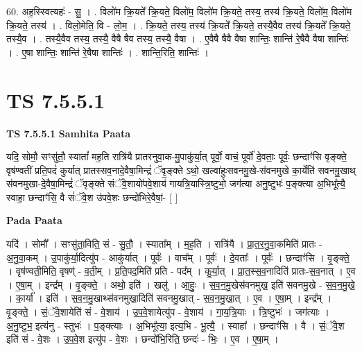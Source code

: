 \documentclass[17pt]{extarticle}
\begin{document}
60. अह॒स्स्वित्यहः॑ - सु॒ । . विलो॑म क्रि॒यते᳚ क्रि॒यते॒ विलो॑म॒ विलो॑म क्रि॒यते॒ तस्य॒ तस्य॑ क्रि॒यते॒ विलो॑म॒ विलो॑म क्रि॒यते॒ तस्य॑ । . विलो॒मेति॒ वि - लो॒म॒ । . क्रि॒यते॒ तस्य॒ तस्य॑ क्रि॒यते᳚ क्रि॒यते॒ तस्यै॒वैव तस्य॑ क्रि॒यते᳚ क्रि॒यते॒ तस्यै॒व । . तस्यै॒वैव तस्य॒ तस्यै॒ वैषै षैव तस्य॒ तस्यै॒ वैषा । . ए॒वैषै षैवै वैषा शान्तिः॒ शान्ति॑ रे॒षैवै वैषा शान्तिः॑ । . ए॒षा शान्तिः॒ शान्ति॑ रे॒षैषा शान्तिः॑ । . शान्ति॒रिति॒ शान्तिः॑ । \newline
\pagebreak
{}

\section{ TS 7.5.5.1 }

\textbf{TS 7.5.5.1 } \newline
\textbf{Samhita Paata} \newline

यदि॒ सोमौ॒ सꣳसु॑तौ॒ स्यातां᳚ मह॒ति रात्रि॑यै प्रातरनुवा॒क-मु॒पाकु॑र्या॒त् पूर्वो॒ वाचं॒ पूर्वो॑ दे॒वताः॒ पूर्वः॒ छन्दाꣳ॑सि वृङ्क्ते॒ वृष॑ण्वतीं प्रति॒पदं॑ कुर्यात् प्रातस्सव॒नादे॒वैषा॒मिन्द्रं॑ ॅवृ॒ङ्क्ते ऽथो॒ खल्वा॑हुःसवनमु॒खे-स॑वनमुखे का॒र्येति॑ सवनमु॒खाथ् स॑वनमुखा-दे॒वैषा॒मिन्द्रं॑ ॅवृङ्क्ते संॅवे॒शायो॑पवे॒शाय॑ गायत्रि॒यास्त्रि॒ष्टुभो॒ जग॑त्या अनु॒ष्टुभः॑ प॒ङ्क्त्या अ॒भिभू᳚त्यै॒ स्वाहा॒ छन्दाꣳ॑सि॒ वै सं॑ॅवे॒श उ॑पवे॒शः छन्दो॑भिरे॒वैषां॒- [  ] \newline

\textbf{Pada Paata} \newline

यदि॑ । सोमौ᳚ । सꣳसु॑ता॒विति॒ सं - सु॒तौ॒ । स्याता᳚म् । म॒ह॒ति । रात्रि॑यै । प्रा॒त॒र॒नु॒वा॒कमिति॑ प्रातः - अ॒नु॒वा॒कम् । उ॒पाकु॑र्या॒दित्यु॑प - आकु॑र्यात् । पूर्वः॑ । वाच᳚म् । पूर्वः॑ । दे॒वताः᳚ । पूर्वः॑ । छन्दाꣳ॑सि । वृ॒ङ्क्ते॒ । वृष॑ण्वती॒मिति॒ वृषण्॑ - व॒ती॒म् । प्र॒ति॒पद॒मिति॑ प्रति - पद᳚म् । कु॒र्या॒त् । प्रा॒त॒स्स॒व॒नादिति॑ प्रातः-स॒व॒नात् । ए॒व । ए॒षा॒म् । इन्द्र᳚म् । वृ॒ङ्क्ते॒ । अथो॒ इति॑ । खलु॑ । आ॒हुः॒ । स॒व॒न॒मु॒खेस॑वनमुख॒ इति॑ सवनमु॒खे - स॒व॒न॒मु॒खे॒ । का॒र्या᳚ । इति॑ । स॒व॒न॒मु॒खाथ्स॑वनमुखा॒दिति॑ सवनमु॒खात् - स॒व॒न॒मु॒खा॒त् । ए॒व । ए॒षा॒म् । इन्द्र᳚म् । वृ॒ङ्क्ते॒ । सं॒ॅवे॒शायेति॑ सं - वे॒शाय॑ । उ॒प॒वे॒शायेत्यु॑प - वे॒शाय॑ । गा॒य॒त्रि॒याः । त्रि॒ष्टुभः॑ । जग॑त्याः । अ॒नु॒ष्टुभ॒ इत्य॑नु - स्तुभः॑ । प॒ङ्क्त्याः । अ॒भिभू᳚त्या॒ इत्य॒भि - भू॒त्यै॒ । स्वाहा᳚ । छन्दाꣳ॑सि । वै । सं॒ॅवे॒श इति॑ सं - वे॒शः । उ॒प॒वे॒श इत्यु॑प - वे॒शः । छन्दो॑भि॒रिति॒ छन्दः॑ - भिः॒ । ए॒व । ए॒षा॒म् ।  \newline
\end{document}
